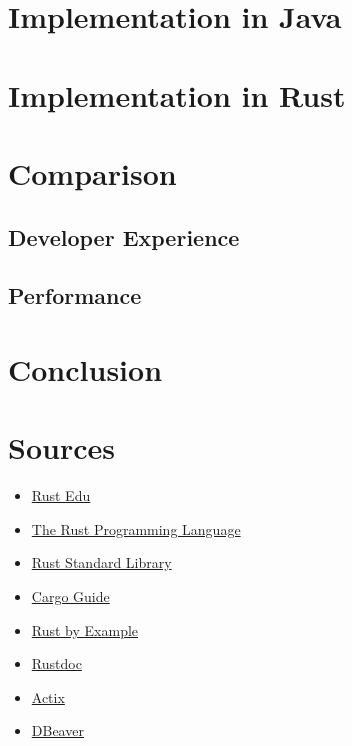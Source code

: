 \documentclass[a4paper,12pt]{article}
\begin{document}
	\section{Implementation in Java}
	\label{sec:java_implementation}

	\section{Implementation in Rust}
	\label{sec:rust_implementation}

	\section{Comparison}
	\label{sec:comparison}
	\subsection{Developer Experience}
	\subsection{Performance}
	
	\section{Conclusion}

	\newpage
	\section{Sources}
	\label{sec:Sources}
	\begin{itemize}
		\item \href{https://rust-edu.org/resources/}{Rust Edu}
		\item \href{https://doc.rust-lang.org/book/}{The Rust Programming Language}
		\item \href{https://doc.rust-lang.org/std/}{Rust Standard Library}
		\item \href{https://doc.rust-lang.org/cargo/}{Cargo Guide}
		\item \href{https://doc.rust-lang.org/rust-by-example/}{Rust by Example}
		\item \href{https://doc.rust-lang.org/rustdoc/}{Rustdoc}
		\item \href{https://actix.rs/}{Actix}
		\item \href{https://dbeaver.io/}{DBeaver}
	\end{itemize}
	\printbibliography[title={Whole bibliography}]
\end{document}

